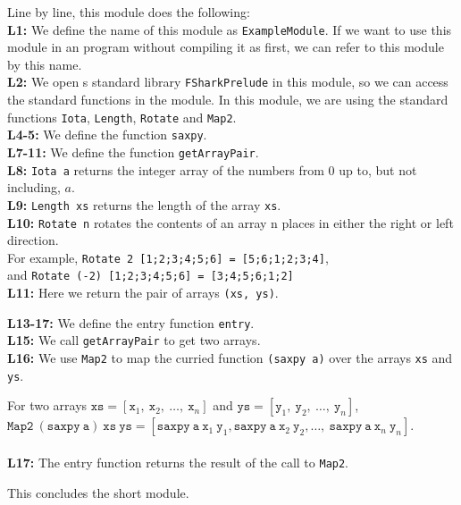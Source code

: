 Line by line, this module does the following:\\
\textbf{L1:} We define the name of this module as \texttt{ExampleModule}. If we
want to use this module in an \fsharp{} program without compiling it as
\fshark{} first, we can refer to this module by this name.
\\
\textbf{L2:} We open \fshark{}s standard library \texttt{FSharkPrelude} in this
module, so we can access the standard functions in the \fshark{} module.
In this module, we are using the standard functions \texttt{Iota}, \texttt{Length}, \texttt{Rotate} and \texttt{Map2}.
\\
\textbf{L4-5:} We define the function \texttt{saxpy}.
\\
\textbf{L7-11:} We define the function \texttt{getArrayPair}.
\\
\textbf{L8:} \texttt{Iota a} returns the integer array of the numbers from $0$
up to, but not including, $a$.
\\
\textbf{L9:} \texttt{Length xs} returns the length of the array \texttt{xs}.
\\
\textbf{L10:} \texttt{Rotate n} rotates the contents of an array n places in
either the right or left direction.\\
For example, \texttt{Rotate 2 [1;2;3;4;5;6] = [5;6;1;2;3;4]},\\
and \texttt{Rotate (-2) [1;2;3;4;5;6] = [3;4;5;6;1;2]}
\\
\textbf{L11:} Here we return the pair of arrays \texttt{(xs, ys)}.

\textbf{L13-17:} We define the entry function \texttt{entry}.\\
\textbf{L15:} We call \texttt{getArrayPair} to get two arrays.\\
\textbf{L16:} We use \texttt{Map2} to map the curried function \texttt{(saxpy
  a)}
over the arrays \texttt{xs} and \texttt{ys}.

For two arrays $\mathtt{xs} =
[\mathtt{x}_1,~\mathtt{x}_2,~\ldots,~\mathtt{x}_n]$ and $\mathtt{ys} =
[\mathtt{y}_1,~\mathtt{y}_2,~\ldots,~\mathtt{y}_n]$,\\
$\mathtt{Map2}~\mathtt{(saxpy~a)}~\mathtt{xs}~\mathtt{ys} =
[\mathtt{saxpy~a}~\mathtt{x}_1~\mathtt{y}_1,
\mathtt{saxpy~a}~\mathtt{x}_2~\mathtt{y}_2,\ldots,~\mathtt{saxpy~a}~\mathtt{x}_n~\mathtt{y}_n]$.
\\
\\
\textbf{L17:} The entry function returns the result of the call to \texttt{Map2}.

This concludes the short \fshark{} module.

